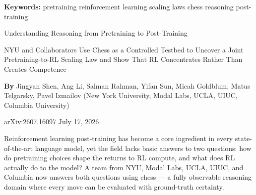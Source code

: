 \documentclass[10pt,twocolumn]{article}
\begin{document}
\setlength{\parindent}{0pt}
\setlength{\parskip}{4pt}

{\small\color{keywordgray}\textbf{Keywords:}
  pretraining \textbullet{}
  reinforcement learning \textbullet{}
  scaling laws \textbullet{}
  chess reasoning \textbullet{}
  post-training}\par\vspace{4pt}

{\LARGE\bfseries\raggedright
  Understanding Reasoning from Pretraining to Post-Training}\par\vspace{4pt}

{\large\itshape\raggedright
  NYU and Collaborators Use Chess as a Controlled Testbed to Uncover a
  Joint Pretraining-to-RL Scaling Law and Show That RL Concentrates
  Rather Than Creates Competence}\par\vspace{6pt}

{\small\textbf{By} Jingyan Shen, Ang Li, Salman Rahman, Yifan Sun,
  Micah Goldblum, Matus Telgarsky, Pavel Izmailov
  (New York University, Modal Labs, UCLA, UIUC, Columbia University)}\par\vspace{2pt}

{\small\color{keywordgray}arXiv:2607.16097 \textbullet{}
  July 17, 2026}
\par\vspace{2pt}\noindent{\color{rulered}\rule{\columnwidth}{0.6pt}}\vspace{6pt}

Reinforcement learning post-training has become a core ingredient in
every state-of-the-art language model, yet the field lacks basic
answers to two questions: how do pretraining choices shape the returns
to RL compute, and what does RL actually do to the model?
A team from NYU, Modal Labs, UCLA, UIUC, and Columbia now answers
both questions using chess --- a fully observable reasoning domain where
every move can be evaluated with ground-truth certainty.
\end{document}
